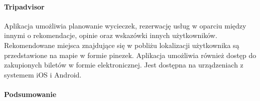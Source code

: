 \paragraph{Tripadvisor}

Aplikacja umożliwia planowanie wycieczek, rezerwację usług  w oparciu między innymi o rekomendacje, opinie oraz wskazówki innych użytkowników.
Rekomendowane miejsca znajdujące się w pobliżu lokalizacji użytkownika są przedstawione na mapie w formie pinezek. Aplikacja umożliwia również dostęp
do zakupionych biletów w formie elektronicznej. Jest dostępna na urządzeniach z systemem iOS i Android.

\paragraph{Podsumowanie}

